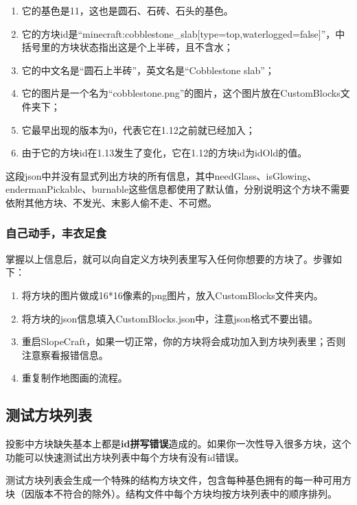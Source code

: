 \documentclass[UTF8]{ctexart}
\begin{document}
\begin{enumerate}
    \item 它的基色是11，这也是圆石、石砖、石头的基色。

    \item 它的方块id是“minecraft:cobblestone\_slab[type=top,waterlogged=false]”，中括号里的方块状态指出这是个上半砖，且不含水；

    \item 它的中文名是“圆石上半砖”，英文名是“Cobblestone slab”；

    \item 它的图片是一个名为“cobblestone.png”的图片，这个图片放在CustomBlocks文件夹下；

    \item 它最早出现的版本为0，代表它在1.12之前就已经加入；

    \item 由于它的方块id在1.13发生了变化，它在1.12的方块id为idOld的值。

\end{enumerate}

这段json中并没有显式列出方块的所有信息，其中needGlass、isGlowing、endermanPickable、burnable这些信息都使用了默认值，分别说明这个方块不需要依附其他方块、不发光、末影人偷不走、不可燃。

\subsubsection{自己动手，丰衣足食}
掌握以上信息后，就可以向自定义方块列表里写入任何你想要的方块了。步骤如下：

\begin{enumerate}
    \item 将方块的图片做成16*16像素的png图片，放入CustomBlocks文件夹内。
    \item 将方块的json信息填入CustomBlocks.json中，注意json格式不要出错。
    \item 重启SlopeCraft，如果一切正常，你的方块将会成功加入到方块列表里；否则注意察看报错信息。
    \item 重复制作地图画的流程。
\end{enumerate}

\subsection{测试方块列表}
投影中方块缺失基本上都是\textbf{id拼写错误}造成的。如果你一次性导入很多方块，这个功能可以快速测试出方块列表中每个方块有没有id错误。

测试方块列表会生成一个特殊的结构方块文件，包含每种基色拥有的每一种可用方块（因版本不符合的除外）。结构文件中每个方块均按方块列表中的顺序排列。
\end{document}
